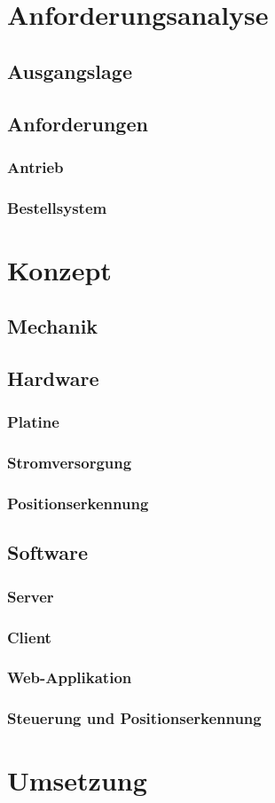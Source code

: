 \chapter{Anforderungsanalyse}

\section{Ausgangslage}

\section{Anforderungen}
\subsection{Antrieb}
\subsection{Bestellsystem}
\chapter{Konzept}
\section{Mechanik}
\section{Hardware}
\subsection{Platine}
\subsection{Stromversorgung}
\subsection{Positionserkennung}

\section{Software}
\subsection{Server}
\subsection{Client}
\subsection{Web-Applikation}
\subsection{Steuerung und Positionserkennung}

\chapter{Umsetzung}

\lipsum